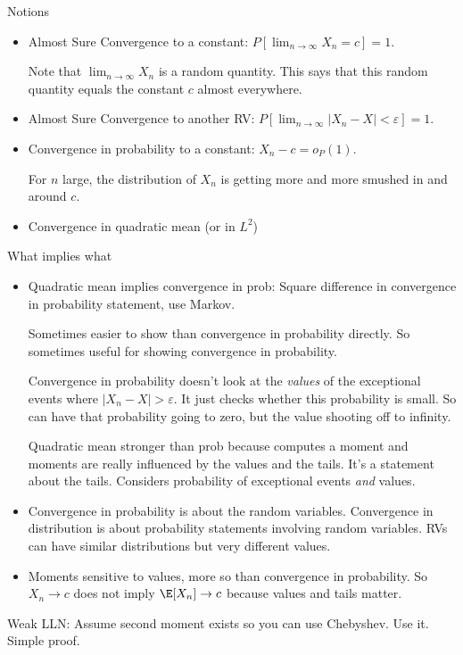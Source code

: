 \documentclass[12pt]{article}
\theoremstyle{plain}
\theoremstyle{definition}
\theoremstyle{remark}
\newcommand{\ra}{\rightarrow}
\newcommand{\limn}{\lim_{n\rightarrow\infty}}
\begin{document}
Notions
\begin{itemize}
  \item Almost Sure Convergence to a constant:
    $P[\limn X_n=c]=1$.

    Note that $\limn X_n$ is a random quantity.
    This says that this random quantity equals the constant $c$ almost
    everywhere.

  \item Almost Sure Convergence to another RV:
    $P[\limn |X_n-X|<\varepsilon]=1$.

  \item
    Convergence in probability to a constant:
    $X_n-c=o_P(1)$.

    For $n$ large, the distribution of $X_n$ is getting more and more
    smushed in and around $c$.

  \item Convergence in quadratic mean (or in $L^2$)
\end{itemize}
What implies what
\begin{itemize}
  \item
    Quadratic mean implies convergence in prob:
    Square difference in convergence in probability statement, use
    Markov.

    Sometimes easier to show than convergence in probability directly.
    So sometimes useful for showing convergence in probability.

    Convergence in probability doesn't look at the \emph{values} of the
    exceptional events where $|X_n-X|>\varepsilon$.
    It just checks whether this probability is small.
    So can have that probability going to zero, but the value shooting
    off to infinity.

    Quadratic mean stronger than prob because computes a moment and
    moments are really influenced by the values and the tails.
    It's a statement about the tails.
    Considers probability of exceptional events \emph{and} values.

  \item Convergence in probability is about the random variables.
    Convergence in distribution is about probability statements
    involving random variables.
    RVs can have similar distributions but very different values.

  \item Moments sensitive to values, more so than convergence in
    probability.
    So $X_n\ra c$ does not imply $\E[X_n]\ra c$ because values and tails
    matter.
\end{itemize}
Weak LLN: Assume second moment exists so you can use Chebyshev. Use it.
Simple proof.
\end{document}

